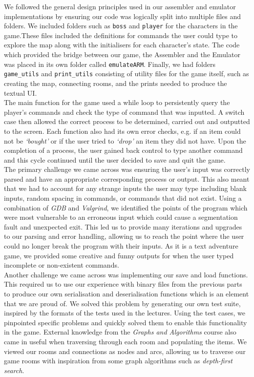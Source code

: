 \documentclass[10pt]{article}
\begin{document}
We followed the general design principles used in our assembler and emulator implementations by ensuring our code was logically split into multiple files and folders. We included folders such as {\tt boss} and {\tt player} for the characters in the game.These files included the definitions for commands the user could type to explore the map along with the initialisers for each character’s state. The code which provided the bridge between our game, the Assembler and the Emulator was placed in its own folder called {\tt emulateARM}. Finally, we had folders {\tt game\_utils} and {\tt print\_utils} consisting of utility files for the game itself, such as creating the map, connecting rooms, and the prints needed to produce the textual UI. 
\\

The main function for the game used a while loop to persistently query the player’s commands and check the type of command that was inputted. A switch case then allowed the correct process to be determined, carried out and outputted to the screen. Each function also had its own error checks, e.g. if an item could not be {\sl ‘bought’} or if the user tried to {\sl ‘drop’} an item they did not have. Upon the completion of a process, the user gained back control to type another command and this cycle continued until the user decided to save and quit the game. 
\\

The primary challenge we came across was ensuring the user’s input was correctly parsed and have an appropriate corresponding process or output. This also meant that we had to account for any strange inputs the user may type including blank inputs, random spacing in commands, or commands that did not exist. Using a combination of {\sl GDB} and {\sl Valgrind}, we identified the points of the program which were most vulnerable to an erroneous input which could cause a segmentation fault and unexpected exit. This led us to provide many iterations and upgrades to our parsing and error handling, allowing us to reach the point where the user could no longer break the program with their inputs. As it is a text adventure game, we provided some creative and funny outputs for when the user typed incomplete or non-existent commands. 
\\

Another challenge we came across was implementing our save and load functions. This required us to use our experience with binary files from the previous parts to produce our own serialisation and deserialisation functions which is an element that we are proud of. We solved this problem by generating our own test suite, inspired by the formats of the tests used in the lectures. Using the test cases, we pinpointed specific problems and quickly solved them to enable this functionality in the game. External knowledge from the {\sl Graphs and Algorithms} course also came in useful when traversing through each room and populating the items. We viewed our rooms and connections as nodes and arcs, allowing us to traverse our game rooms with inspiration from some graph algorithms such as {\sl depth-first search}. 
\end{document}
